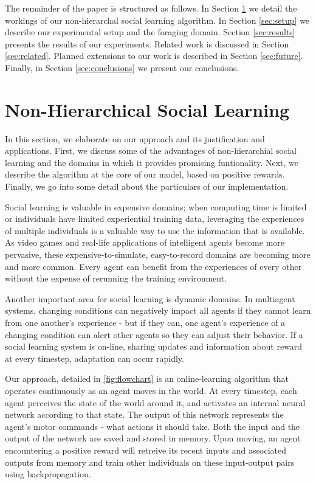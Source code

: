 \documentclass{acm_proc_article-sp}
\begin{document}
The remainder of the paper is structured as follows.
In Section \ref{sec:nhsl} we detail the workings of our non-hierarchal social learning algorithm.
In Section \ref{sec:setup} we describe our experimental setup and the foraging domain.
Section \ref{sec:results} presents the results of our experiments.
Related work is discussed in Section \ref{sec:related}. Planned extensions to our work is described in Section \ref{sec:future}. Finally, in Section \ref{sec:conclusions} we present our conclusions.

\section{Non-Hierarchical Social Learning}
\label{sec:nhsl}
In this section, we elaborate on our approach and its justification and applications. First, we discuss some of the advantages of non-hierarchial social learning and the domains in which it provides promising funtionality.  Next, we describe the algorithm at the core of our model, based on positive rewards.  Finally, we go into some detail about the particulars of our implementation.

Social learning is valuable in expensive domains; when computing time is limited or individuals have limited experiential training data, leveraging the experiences of multiple individuals is a valuable way to use the information that is available. As video games and real-life applications of intelligent agents become more pervasive, these expensive-to-simulate, easy-to-record domains are becoming more and more common. Every agent can benefit from the experiences of every other without the expense of rerunning the training environment.  

Another important area for social learning is dynamic domains.  In multiagent systems, changing conditions can negatively impact all agents if they cannot learn from one another's experience - but if they can, one agent's experience of a changing condition can alert other agents so they can adjust their behavior. If a social learning system is on-line, sharing updates and information about reward at every timestep, adaptation can occur rapidly.

Our approach, detailed in \ref{fig:flowchart} is an online-learning algorithm that operates continuously as an agent moves in the world.  At every timestep, each agent perceives the state of the world around it, and activates an internal neural network according to that state.  The output of this network represents the agent's motor commands - what actions it should take. Both the input and the output of the network are saved and stored in memory. Upon moving, an agent encountering a positive reward will retreive its recent inputs and associated outputs from memory and train other individuals on these input-output pairs using backpropagation.
\end{document}

